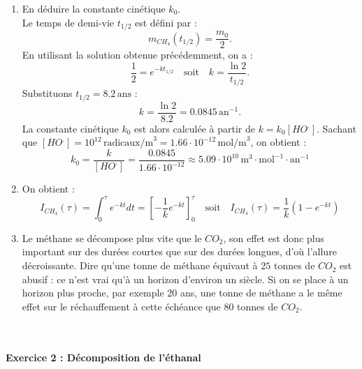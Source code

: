 \documentclass[a4paper,10pt,notitlepage,oneside]{article}
\theoremstyle{plain}
\begin{document}
\begin{enumerate}
    \item En déduire la constante cinétique \(k_0\).\\
    Le temps de demi-vie \(t_{1/2}\) est défini par :
    \[
    m_{CH_4}(t_{1/2}) = \dfrac{m_0}{2}.
    \]
    En utilisant la solution obtenue précédemment, on a :
    \[
    \dfrac{1}{2} = e^{-k t_{1/2}} \quad \text{soit} \quad k = \dfrac{\ln 2}{t_{1/2}}.
    \]
    Substituons \(t_{1/2} = 8.2 \, \text{ans}\) :
    \[
    k = \dfrac{\ln 2}{8.2} = 0.0845 \, \text{an}^{-1}.
    \]
    La constante cinétique \(k_0\) est alors calculée à partir de \(k = k_0 [HO^.]\). Sachant que \([HO^.] = 10^{12} \, \text{radicaux/m}^3 = 1.66 \cdot 10^{-12} \, \text{mol/m}^3\), on obtient :
    \begin{equation*}
        \boxed{k_0 = \dfrac{k}{[HO^.]} = \dfrac{0.0845}{1.66 \cdot 10^{-12}} \approx 5.09 \cdot 10^{10} \, \text{m}^3 \cdot \text{mol}^{-1} \cdot \text{an}^{-1}}
    \end{equation*}
    \item On obtient :
    \begin{equation*}
        I_{CH_4}(\tau) = \displaystyle{\int_0^\tau}e^{-kt}dt = \left[-\dfrac{1}{k}e^{-kt}\right]_0^\tau \quad \text{soit} \quad \boxed{I_{CH_4}(\tau) = \dfrac{1}{k}\left(1-e^{-kt}\right)}
    \end{equation*}
    \item Le méthane se décompose plus vite que le $CO_2$, son effet est donc plus important sur des durées courtes que sur des durées longues, d’où l’allure décroissante. Dire qu’une tonne de méthane équivaut à $25$ tonnes de $CO_2$ est abusif : ce n’est vrai qu’à un horizon d’environ un siècle. Si on se place à un horizon plus proche, par exemple 20 ans, une tonne de méthane a le même effet sur le réchauffement à cette échéance que 80 tonnes de $CO_2$.  
\end{enumerate}


\\

\paragraph{\color{BlueViolet} Exercice 2 : Décomposition de l'éthanal}
\end{document}
